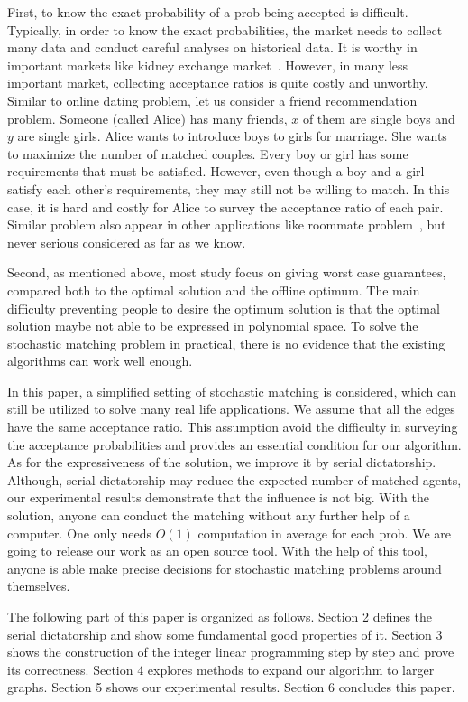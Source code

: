 \documentclass[letterpaper]{article}
\begin{document}
First, to know the exact probability of a prob being accepted is difficult.
Typically, in order to know the exact probabilities, the market needs to collect many data and conduct careful analyses on historical data.
It is worthy in important markets like kidney exchange market~\cite{dickerson2013failure,dickerson2015futurematch}.
However, in many less important market, collecting acceptance ratios is quite costly and unworthy.
Similar to online dating problem, let us consider a friend recommendation problem.
Someone (called Alice) has many friends, $x$ of them are single boys and $y$ are single girls.
Alice wants to introduce boys to girls for marriage.
She wants to maximize the number of matched couples.
Every boy or girl has some requirements that must be satisfied.
However, even though a boy and a girl satisfy each other's requirements, they may still not be willing to match.
In this case, it is hard and costly for Alice to survey the acceptance ratio of each pair.
Similar problem also appear in other applications like roommate problem~\cite{roth1982incentive}, but never serious considered as far as we know.

Second, as mentioned above, most study focus on giving worst case guarantees, compared both to the optimal solution and the offline optimum. 
The main difficulty preventing people to desire the optimum solution is that the optimal solution maybe not able to be expressed in polynomial space.
To solve the stochastic matching problem in practical, there is no evidence that the existing algorithms can work well enough.

In this paper, a simplified setting of stochastic matching is considered, which can still be utilized to solve many real life applications.
We assume that all the edges have the same acceptance ratio.
This assumption avoid the difficulty in surveying the acceptance probabilities and provides an essential condition for our algorithm.
As for the expressiveness of the solution, we improve it by serial dictatorship.
Although, serial dictatorship may reduce the expected number of matched agents, our experimental results demonstrate that the influence is not big.
With the solution, anyone can conduct the matching without any further help of a computer. 
One only needs $O(1)$ computation in average for each prob.
We are going to release our work as an open source tool. 
With the help of this tool, anyone is able make precise decisions for stochastic matching problems around themselves. 

The following part of this paper is organized as follows. Section 2 defines the serial dictatorship and show some fundamental good properties of it. Section 3 shows the construction of the integer linear programming step by step and prove its correctness. Section 4 explores methods to expand our algorithm to larger graphs. Section 5 shows our experimental results. Section 6 concludes this paper.
\end{document}
